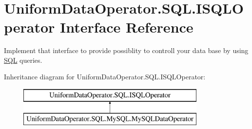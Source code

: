 \hypertarget{interface_uniform_data_operator_1_1_s_q_l_1_1_i_s_q_l_operator}{}\section{Uniform\+Data\+Operator.\+S\+Q\+L.\+I\+S\+Q\+L\+Operator Interface Reference}
\label{interface_uniform_data_operator_1_1_s_q_l_1_1_i_s_q_l_operator}


Implement that interface to provide possiblity to controll your data base by using \mbox{\hyperlink{namespace_uniform_data_operator_1_1_s_q_l}{S\+QL}} queries.  


Inheritance diagram for Uniform\+Data\+Operator.\+S\+Q\+L.\+I\+S\+Q\+L\+Operator\+:\begin{figure}[H]
\begin{center}
\leavevmode
\includegraphics[height=2.000000cm]{de/d4a/interface_uniform_data_operator_1_1_s_q_l_1_1_i_s_q_l_operator}
\end{center}
\end{figure}
